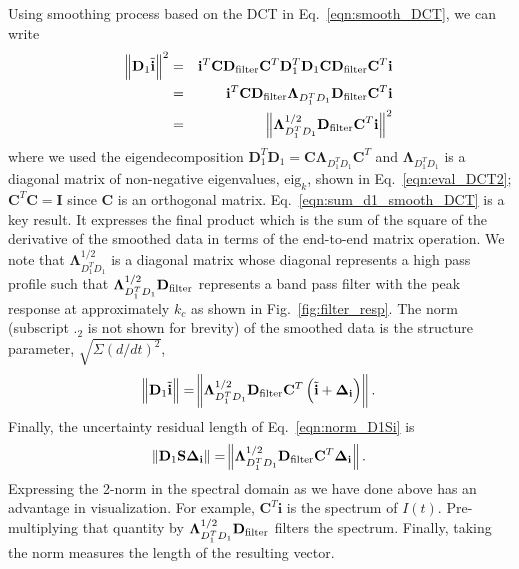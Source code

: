 \documentclass[twocolumn]{aastex631}
\providecommand{\DIFadd}[1]{{\protect\color{BLUE}#1}} %
\providecommand{\DIFdel}[1]{{\protect\color{RED}#1}} %
\providecommand{\DIFaddbegin}{} \providecommand{\DIFaddend}{} %
\providecommand{\DIFdelbegin}{} \providecommand{\DIFdelend}{} %
\newcommand{\DIFscaledelfig}{0.5}
\newlength{\DIFdelgraphicswidth} %
\newlength{\DIFdelgraphicsheight} %
\newcommand{\DIFaddincludegraphics}[2][]{{\color{blue}\fbox{\DIFOincludegraphics[#1]{#2}}}} %
\newcommand{\DIFdelincludegraphics}[2][]{%
\sbox{\DIFdelgraphicsbox}{\DIFOincludegraphics[#1]{#2}}%
\settoboxwidth{\DIFdelgraphicswidth}{\DIFdelgraphicsbox} %
\settoboxtotalheight{\DIFdelgraphicsheight}{\DIFdelgraphicsbox} %
\scalebox{\DIFscaledelfig}{%
\parbox[b]{\DIFdelgraphicswidth}{\usebox{\DIFdelgraphicsbox}\\[-\baselineskip] \rule{\DIFdelgraphicswidth}{0em}}\llap{\resizebox{\DIFdelgraphicswidth}{\DIFdelgraphicsheight}{%
\setlength{\unitlength}{\DIFdelgraphicswidth}%
\begin{picture}(1,1)%
\thicklines\linethickness{2pt} %
{\color[rgb]{1,0,0}\put(0,0){\framebox(1,1){}}}%
{\color[rgb]{1,0,0}\put(0,0){\line( 1,1){1}}}%
{\color[rgb]{1,0,0}\put(0,1){\line(1,-1){1}}}%
\end{picture}%
}\hspace*{3pt}}} %
} %
\DeclareRobustCommand{\DIFaddbegin}{\DIFOaddbegin \let\includegraphics\DIFaddincludegraphics} %
\DeclareRobustCommand{\DIFaddend}{\DIFOaddend \let\includegraphics\DIFOincludegraphics} %
\DeclareRobustCommand{\DIFdelbegin}{\DIFOdelbegin \let\includegraphics\DIFdelincludegraphics} %
\DeclareRobustCommand{\DIFdelend}{\DIFOaddend \let\includegraphics\DIFOincludegraphics} %
\begin{document}
Using smoothing process based on the DCT in Eq.~\eqref{eqn:smooth_DCT}, we can write
\begin{eqnarray}
\norm{\mathbf{D}_1\tilde{\mathbf{i}}}^2
&=&\mathbf{i}^T \mathbf{C}\mathbf{D}_{\rm filter}\mathbf{C}^T\mathbf{D}_1^T\mathbf{D}_1\mathbf{C}\mathbf{D}_{\rm filter}\mathbf{C}^T\mathbf{i} \nonumber \\
&=&\mathbf{i}^T\mathbf{C}\mathbf{D}_{\rm filter}\mathbf{\Lambda}_{D_1^TD_1}\mathbf{D}_{\rm filter}\mathbf{C}^T\mathbf{i} \nonumber\\
&=&\norm{\mathbf{\Lambda}_{D_1^TD_1}^{1/2}\mathbf{D}_{\rm filter}\mathbf{C}^T\mathbf{i}}^2
\label{eqn:sum_d1_smooth_DCT}
\end{eqnarray}
where we used the eigendecomposition $\mathbf{D}_1^T\mathbf{D}_1=\mathbf{C}\mathbf{\Lambda}_{D_1^TD_1}\mathbf{C}^T$ and $\mathbf{\Lambda}_{D_1^TD_1}$ is a diagonal matrix of non-negative eigenvalues, $\text{eig}_k$, shown in Eq.~\eqref{eqn:eval_DCT2}; $\mathbf{C}^T\mathbf{C}=\mathbf{I}$ since $\mathbf{C}$ is an orthogonal matrix. Eq.~\eqref{eqn:sum_d1_smooth_DCT} is a key result. It expresses the final product which is the sum of the square of the derivative of the smoothed data in terms of the end-to-end matrix operation. We note that $\mathbf{\Lambda}_{D_1^TD_1}^{1/2}$ is a diagonal matrix whose diagonal represents a high pass profile such that $\mathbf{\Lambda}_{D_1^TD_1}^{1/2}\mathbf{D}_{\rm filter}$ represents a band pass filter with the peak response at approximately $k_c$ as shown in Fig.~\ref{fig:filter_resp}. The norm (subscript $._2$ is not shown for brevity)  of the smoothed data is the structure parameter, $\sqrt{\Sigma(d/dt)^2}$,
\begin{eqnarray}
\norm{\mathbf{D}_1\tilde{\mathbf{i}}}=\norm{\mathbf{\Lambda}_{D_1^TD_1}^{1/2}\mathbf{D}_{\rm filter}\mathbf{C}^T\left(\tilde{\mathbf{i}}+\mathbf{\Delta_i}\right)}. 
\label{eqn:norm_res}
\end{eqnarray} 
Finally, the \DIFdelbegin \DIFdel{uncertainty }\DIFdelend \DIFaddbegin \DIFadd{residual length of Eq.~\eqref{eqn:norm_D1Si} }\DIFaddend is 
\begin{eqnarray}
\norm{\mathbf{D}_1\mathbf{S}\mathbf{\Delta}_\mathbf{i}}=\norm{\mathbf{\Lambda}_{D_1^TD_1}^{1/2}\mathbf{D}_{\rm filter}\mathbf{C}^T\mathbf{\Delta_i}}.
\label{eqn:norm_del}
\end{eqnarray}
Expressing the 2-norm in the spectral domain as we have done above has an advantage in visualization. For example, $\mathbf{C}^T\mathbf{i}$ is the spectrum of $I(t)$. Pre-multiplying that quantity by $\mathbf{\Lambda}_{D_1^TD_1}^{1/2}\mathbf{D}_{\rm filter}$ filters the spectrum. Finally, taking the norm measures the length of the resulting vector.
\end{document}
